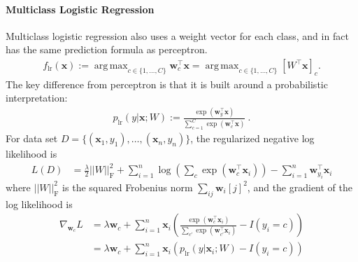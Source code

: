 \documentclass[10pt]{article}
\newcommand{\bx}{{\boldsymbol x}}
\newcommand{\bw}{{\boldsymbol w}}
\DeclareMathOperator*{\argmax}{arg\,max}
\begin{document}
\paragraph{Multiclass Logistic Regression} Multiclass logistic regression also uses a weight vector for each class, and in fact has the same prediction formula as perceptron.
\begin{align}
f_{\mathrm{lr}}(\bx) := \argmax_{c \in \{1, \ldots, C\}} \bw_c^\top \bx = \argmax_{c \in \{1, \ldots, C\}} \left[ W^\top \bx \right]_{c}.
\end{align}
The key difference from perceptron is that it is built around a probabilistic interpretation:
\begin{align}
p_{\mathrm{lr}}(y | \bx; W) := \frac{\exp(\bw_y^\top \bx)}{\sum_{c = 1}^C \exp(\bw_c^\top \bx)} ~ .
\end{align}
For data set $D = \{(\bx_1, y_1), \ldots, (\bx_n, y_n)\}$, the regularized negative log likelihood is
\begin{align}
L(D) &= \frac{\lambda}{2} ||W||^2_{\textrm{F}} + \sum_{i=1}^n \log \left(\sum_{c} \exp(\bw_{c}^\top \bx_i)\right) - \sum_{i = 1}^n \bw_{y_i}^\top \bx_i 
\label{eq:nll}
\end{align}
where $||W||^2_{\textrm{F}}$ is the squared Frobenius norm $\sum_{ij} \bw_i[j]^2$, 
and the gradient of the log likelihood is
\begin{align}
\nabla_{\bw_c} L &= \lambda \bw_c + \sum_{i = 1}^n  \bx_i \left(\frac{\exp(\bw_{c}^\top \bx_i)}{\sum_{c'} \exp(\bw_{c'}^\top \bx_i)} - I(y_i = c) \right) \label{eq:lrgrad}
\\
 &= \lambda \bw_c + \sum_{i = 1}^n  \bx_i \left(p_{\textrm{lr}}(y | \bx_i; W) - I(y_i = c) \right)
 \label{eq:simplified-lrgrad}
\end{align}
\end{document}
